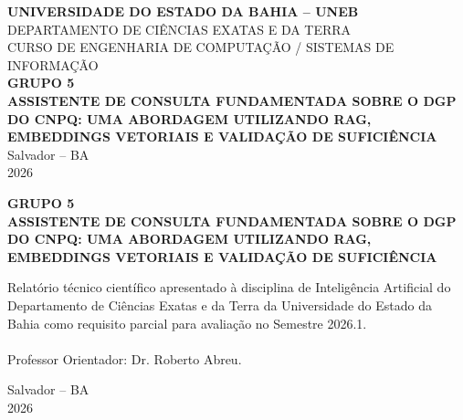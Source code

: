 \documentclass[12pt,a4paper]{article}
\begin{document}
\begin{titlepage}
    \begin{center}
        {\large\bfseries UNIVERSIDADE DO ESTADO DA BAHIA -- UNEB} \\
        {\large DEPARTAMENTO DE CIÊNCIAS EXATAS E DA TERRA} \\
        {\large CURSO DE ENGENHARIA DE COMPUTAÇÃO / SISTEMAS DE INFORMAÇÃO} \\
        \vspace{4.0cm}
        {\large\bfseries GRUPO 5} \\
        \vspace{4.0cm}
        {\Large\bfseries ASSISTENTE DE CONSULTA FUNDAMENTADA SOBRE O DGP DO CNPQ: UMA ABORDAGEM UTILIZANDO RAG, EMBEDDINGS VETORIAIS E VALIDAÇÃO DE SUFICIÊNCIA} \\
        \vspace{4.0cm}
        \vfill
        {\large Salvador -- BA} \\
        {\large 2026}
    \end{center}
\end{titlepage}

\begin{titlepage}
    \begin{center}
        {\large\bfseries GRUPO 5} \\
        \vspace{4.0cm}
        {\Large\bfseries ASSISTENTE DE CONSULTA FUNDAMENTADA SOBRE O DGP DO CNPQ: UMA ABORDAGEM UTILIZANDO RAG, EMBEDDINGS VETORIAIS E VALIDAÇÃO DE SUFICIÊNCIA} \\
        \vspace{3.0cm}
        
        \hspace{7.0cm}
        \begin{minipage}{8.0cm}
            \small Relatório técnico científico apresentado à disciplina de Inteligência Artificial do Departamento de Ciências Exatas e da Terra da Universidade do Estado da Bahia como requisito parcial para avaliação no Semestre 2026.1.\\
            \\
            Professor Orientador: Dr. Roberto Abreu.
        \end{minipage}
        
        \vfill
        {\large Salvador -- BA} \\
        {\large 2026}
    \end{center}
\end{titlepage}
\end{document}
